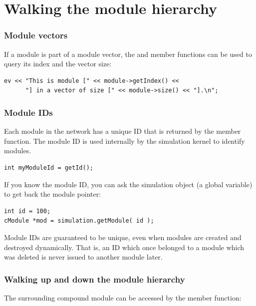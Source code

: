 \section{Walking the module hierarchy}
\label{ch:simple-modules:walking-module-hierarchy}

\subsubsection{Module vectors}


If a module is part of a module vector, the
 and  member functions can be used to
query its index and the vector size:

\begin{verbatim}
ev << "This is module [" << module->getIndex() <<
      "] in a vector of size [" << module->size() << "].\n";
\end{verbatim}


\subsubsection{Module IDs}


Each module in the network has a unique ID that is returned by the
 member function. The module ID is used
internally by the simulation kernel to identify modules.

\begin{verbatim}
int myModuleId = getId();
\end{verbatim}

If you know the module ID, you can ask the simulation object
(a global variable) to get back the module pointer:

\begin{verbatim}
int id = 100;
cModule *mod = simulation.getModule( id );
\end{verbatim}


Module IDs are guaranteed to be unique, even when modules are
created and destroyed dynamically. That is, an ID which once
belonged to a module which was deleted is never issued to another
module later.


\subsubsection{Walking up and down the module hierarchy}


The surrounding compound module can be accessed by the
 member function:

